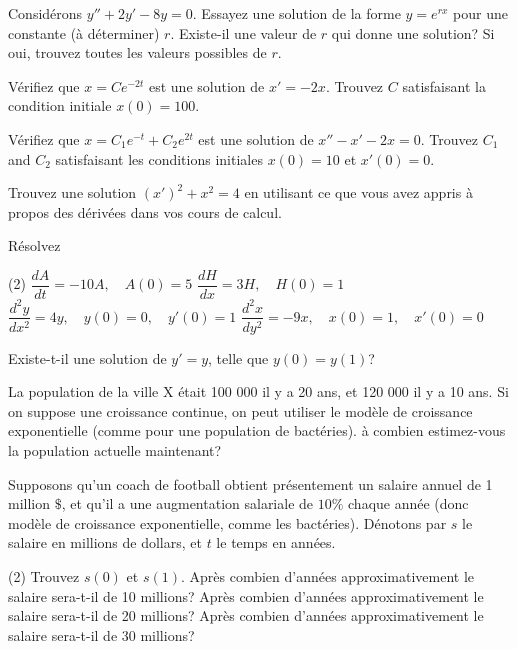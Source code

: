 \begin{exercise}
Considérons $y'' + 2y' - 8y = 0$.  
Essayez une solution de la forme $y = e^{rx}$ pour une constante (à déterminer) $r$.  Existe-il une valeur de $r$ qui donne une solution? Si oui, trouvez toutes les valeurs possibles de $r$.
\end{exercise}

\begin{exercise}
Vérifiez que $x = C e^{-2t}$ est une solution de $x' = -2x$.
Trouvez $C$ satisfaisant la condition initiale $x(0) = 100$.
\end{exercise}

\begin{exercise}
	Vérifiez que $x = C_1 e^{-t} + C_2 e^{2t}$ est une solution de $x'' - x' -2 x =
	0$.  Trouvez $C_1$ and $C_2$ satisfaisant les conditions initiales $x(0) = 10$
	et $x'(0) = 0$.
\end{exercise}

\begin{exercise}
	Trouvez une solution
	${(x')}^2 + x^2 = 4$
	en utilisant ce que vous avez appris à propos des dérivées dans vos cours de calcul.
\end{exercise}

\begin{exercise}
	Résolvez 
	\begin{tasks}(2)
		\task $\dfrac{dA}{dt} = -10 A, \quad A(0)=5$
		\task $\dfrac{dH}{dx} = 3 H, \quad H(0)=1$
		\task $\dfrac{d^2y}{dx^2} = 4 y, \quad y(0)=0, \quad y'(0)=1$
		\task $\dfrac{d^2x}{dy^2} = -9 x, \quad x(0)=1, \quad x'(0)=0$
	\end{tasks}
\end{exercise}

\begin{exercise}
	Existe-t-il une solution de $y' = y$, telle que $y(0) = y(1)$?
\end{exercise}

\begin{exercise}
	La population de la ville X était 100 000 il y a 20 ans, et 120 000 il y a 10 ans.  Si on suppose une croissance continue, on peut utiliser le modèle de croissance exponentielle (comme pour une population de bactéries).  à combien estimez-vous la population actuelle maintenant?
\end{exercise}

\begin{exercise}
	Supposons qu'un coach de football obtient présentement un salaire annuel de 1 million $\$$, et qu'il a une augmentation salariale de $10\%$ chaque année (donc modèle de croissance exponentielle, comme les bactéries).  Dénotons par $s$ le salaire en millions de dollars, et $t$ le temps en années.
	\begin{tasks}(2)
	\task Trouvez $s(0)$ et $s(1)$.
	\task Après combien d'années approximativement le salaire sera-t-il de 10 millions?
	\task Après combien d'années approximativement le salaire sera-t-il de 20 millions?
	\task Après combien d'années approximativement le salaire sera-t-il de 30 millions?
	\end{tasks}
\end{exercise}


